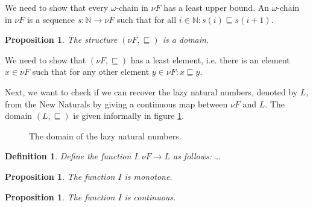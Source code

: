 \documentclass[a4paper]{article}
\newcommand{\arr}{\rightarrow}
\newtheorem{thmPONuFisADomain}[defNuF]{Proposition}
\newtheorem{defIMapsNuFToL}[defNuF]{Definition}
\newtheorem{thmIIsMonotone}[defNuF]{Proposition}
\newtheorem{thmIIsContinuous}[defNuF]{Proposition}
\begin{document}
We need to show that every $\omega$-chain in $\nu F$ has a least upper bound.
An $\omega$-chain in $\nu F$ is a sequence $s : \mathbb{N} \arr \nu F$ such
that for all $i \in \mathbb{N}: s(i) \sqsubseteq s(i + 1)$.


\begin{thmPONuFisADomain}

The structure $(\nu F, \sqsubseteq)$ is a domain.

\end{thmPONuFisADomain}

We need to show that $(\nu F, \sqsubseteq)$ has a least element, i.e. there is
an element $x \in \nu F$ such that for any other element $y \in \nu F: x
\sqsubseteq y$.

Next, we want to check if we can recover the lazy natural numbers, denoted by
$L$, from the New Naturals by giving a continuous map between $\nu F$ and $L$.
The domain $(L, \sqsubseteq)$ is given informally in figure
\ref{fig:DomainOfLazyNaturals}.

\begin{figure}[htb]
\begin{center}
\end{center}
\caption{The domain of the lazy natural numbers.}
\label{fig:DomainOfLazyNaturals}
\end{figure}


\begin{defIMapsNuFToL}

Define the function $I : \nu F \arr L$ as follows: \ldots

\end{defIMapsNuFToL}


\begin{thmIIsMonotone}

The function $I$ is monotone.

\end{thmIIsMonotone}


\begin{thmIIsContinuous}

The function $I$ is continuous.

\end{thmIIsContinuous}
\end{document}
